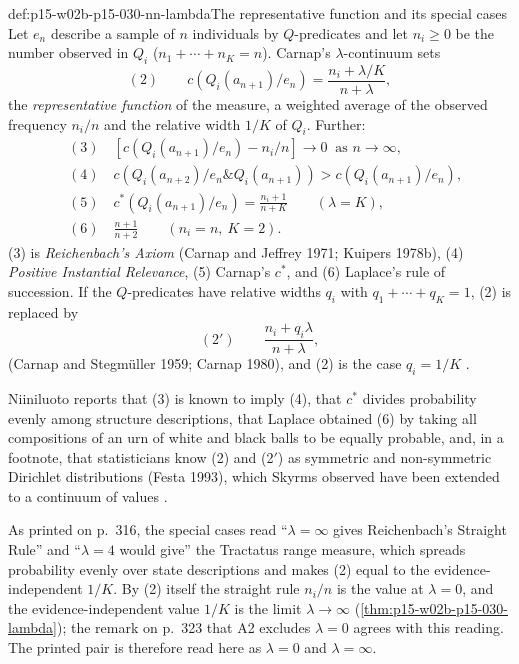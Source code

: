 \begin{hbdefinition}{def:p15-w02b-p15-030-nn-lambda}{The representative function and its special cases}
Let \(e_n\) describe a sample of \(n\) individuals by \(Q\)-predicates
and let \(n_i\geq0\) be the number observed in \(Q_i\)
(\(n_1+\cdots+n_K=n\)). Carnap's \(\lambda\)-continuum sets
\[
 (2)\qquad c(Q_i(a_{n+1})/e_n)=\frac{n_i+\lambda/K}{n+\lambda},
\]
the \emph{representative function} of the measure, a weighted average of
the observed frequency \(n_i/n\) and the relative width \(1/K\) of
\(Q_i\). Further:
\[
\begin{aligned}
 &(3)\quad [c(Q_i(a_{n+1})/e_n)-n_i/n]\to0\ \text{ as }n\to\infty,\\
 &(4)\quad c(Q_i(a_{n+2})/e_n\&Q_i(a_{n+1}))>c(Q_i(a_{n+1})/e_n),\\
 &(5)\quad c^*(Q_i(a_{n+1})/e_n)=\frac{n_i+1}{n+K}\qquad(\lambda=K),\\
 &(6)\quad \frac{n+1}{n+2}\qquad(n_i=n,\ K=2).
\end{aligned}
\]
(3) is \emph{Reichenbach's Axiom} (Carnap and Jeffrey 1971; Kuipers
1978b), (4) \emph{Positive Instantial
Relevance}, (5) Carnap's \(c^*\), and (6) Laplace's rule of succession.
If the \(Q\)-predicates have relative widths \(q_i\) with
\(q_1+\cdots+q_K=1\), (2) is replaced by
\[
 (2')\qquad \frac{n_i+q_i\lambda}{n+\lambda},
\]
(Carnap and Stegmüller 1959; Carnap 1980), and (2) is the case \(q_i=1/K\)
\cite[pp.~316--317]{Niiniluoto2011HintikkaProgramReading}.
\end{hbdefinition}

Niiniluoto reports that (3) is known to imply (4), that \(c^*\) divides
probability evenly among structure descriptions, that Laplace obtained
(6) by taking all compositions of an urn of white and black balls to be
equally probable, and, in a footnote, that statisticians know (2) and
(2\('\)) as symmetric and non-symmetric Dirichlet distributions (Festa
1993), which
Skyrms observed have been extended to a continuum of values
\cite[pp.~316--317 and n.~2]{Niiniluoto2011HintikkaProgramReading}.

As printed on p.~316, the special cases read ``\(\lambda=\infty\) gives
Reichenbach's Straight Rule'' and ``\(\lambda=4\) would give'' the
Tractatus range measure, which spreads probability evenly over state
descriptions and makes (2) equal to the evidence-independent \(1/K\).
By (2) itself the straight rule \(n_i/n\) is the value at \(\lambda=0\),
and the evidence-independent value \(1/K\) is the limit
\(\lambda\to\infty\) (\cref{thm:p15-w02b-p15-030-lambda}); the remark on
p.~323 that A2 excludes \(\lambda=0\) agrees with this reading. The
printed pair is therefore read here as \(\lambda=0\) and
\(\lambda=\infty\).

